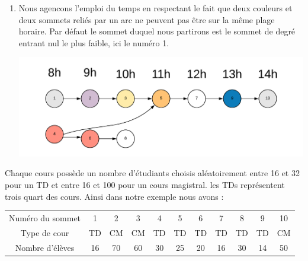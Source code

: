 \documentclass[a4paper,11pt]{article}
\begin{document}
\begin{enumerate}
			\item Nous agencons l'emploi du temps en respectant le fait que deux couleurs et deux sommets reliés par un arc ne peuvent pas être sur la même plage horaire. Par défaut le sommet duquel nous partirons est le sommet de degré entrant nul le plus faible, ici le numéro 1.
			\centerline{\includegraphics[scale=0.8]{Captures/exemple4.png}}
		\end{enumerate}
		Chaque cours possède un nombre d'étudiants choisis aléatoirement entre 16 et 32 pour un TD et entre 16 et 100 pour un cours magistral. les TDs représentent trois quart des cours. Ainsi dans notre exemple nous avons : \\
		\begin{tabular}{ | c | c | c | c | c | c | c | c | c | c | c |}
 			\hline			
   			Numéro du sommet & 1 & 2 & 3 & 4 & 5 & 6 & 7 & 8 & 9 & 10\\
   			Type de cour & TD & CM & CM & TD & TD & TD & TD & TD & TD & CM \\
   			Nombre d'élèves & 16 & 70 & 60 & 30 & 25 & 20 & 16 & 30 & 14 & 50\\
 			\hline  
 		\end{tabular}\\
\end{document}
